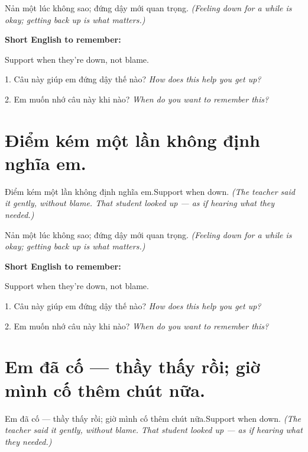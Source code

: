 \begin{baihoc}
Nản một lúc không sao; đứng dậy mới quan trọng.
\textit{(Feeling down for a while is okay; getting back up is what matters.)}
\end{baihoc}

\begin{ghinhoanh}
\textbf{Short English to remember:}

Support when they're down, not blame.

\end{ghinhoanh}

\begin{tuhocnhanh}
1. Câu này giúp em đứng dậy thế nào? \textit{How does this help you get up?}

2. Em muốn nhớ câu này khi nào? \textit{When do you want to remember this?}
\end{tuhocnhanh}
\ngancach


\section{Điểm kém một lần không định nghĩa em.}
\begin{truyen}{Điểm kém một lần không định nghĩa em.}{Support when down.}
\textit{(The teacher said it gently, without blame. That student looked up — as if hearing what they needed.)}
\end{truyen}

\begin{baihoc}
Nản một lúc không sao; đứng dậy mới quan trọng.
\textit{(Feeling down for a while is okay; getting back up is what matters.)}
\end{baihoc}

\begin{ghinhoanh}
\textbf{Short English to remember:}

Support when they're down, not blame.

\end{ghinhoanh}

\begin{tuhocnhanh}
1. Câu này giúp em đứng dậy thế nào? \textit{How does this help you get up?}

2. Em muốn nhớ câu này khi nào? \textit{When do you want to remember this?}
\end{tuhocnhanh}
\ngancach


\section{Em đã cố — thầy thấy rồi; giờ mình cố thêm chút nữa.}
\begin{truyen}{Em đã cố — thầy thấy rồi; giờ mình cố thêm chút nữa.}{Support when down.}
\textit{(The teacher said it gently, without blame. That student looked up — as if hearing what they needed.)}
\end{truyen}


